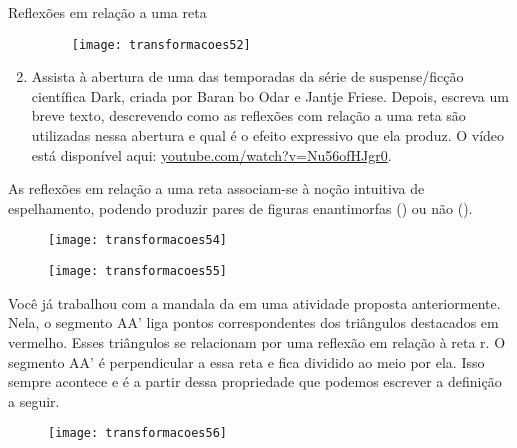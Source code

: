 \begin{task}{Reflexões em relação a uma reta}
\begin{enumerate}
\begin{figure}[H]
\centering

\texttt{[image: transformacoes52]}
\end{figure}

\item Assista à abertura de uma das temporadas da série de suspense/ficção científica Dark, criada por Baran bo Odar e Jantje Friese. Depois, escreva um breve texto, descrevendo como as reflexões com relação a uma reta são utilizadas nessa abertura e qual é o efeito expressivo que ela produz. O vídeo está disponível aqui: \url{youtube.com/watch?v=Nu56ofHJgr0}. 
\end{enumerate}

\end{task}



As reflexões em relação a uma reta associam-se à noção intuitiva de espelhamento, podendo produzir pares de figuras enantimorfas () ou não (). 

\begin{multicols}{2}
\begin{figure}[H]
\centering

\texttt{[image: transformacoes54]}
\caption{}
\label{transformacoes54}
\end{figure}

\begin{figure}[H]
\centering

\texttt{[image: transformacoes55]}
\caption{}
\label{transformacoes55}
\end{figure}
\end{multicols}
                      
Você já trabalhou com a mandala da  em uma atividade proposta anteriormente. Nela, o segmento AA’ liga pontos correspondentes dos triângulos destacados em vermelho. Esses triângulos se relacionam por uma reflexão em relação à reta r. O segmento AA’ é perpendicular a essa reta e fica dividido ao meio por ela. Isso sempre acontece e é a partir dessa propriedade que podemos escrever a definição a seguir. 

\begin{figure}[H]
\centering

\texttt{[image: transformacoes56]}
\caption{}
\label{transformacoes56}
\end{figure}

